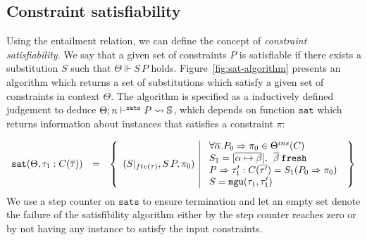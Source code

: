 \documentclass[a4paper, 11pt]{article}
\begin{document}
\subsection{Constraint satisfiability}

Using the entailment relation, we can define the concept of 
\emph{constraint satisfiability}. We say that a given set 
of constraints $P$ is satisfiable if there exists a substitution 
$S$ such that $\Theta \Vdash S\,P$ holds. Figure~\ref{fig:sat-algorithm} 
presents an algorithm which returns a set of substitutions 
which satisfy a given set of constraints in context $\Theta$. 
The algorithm is specified as a inductively defined judgement 
to deduce $\sats{P}{\mathbb{S}}{n}$, which 
depends on function $\mathtt{sat}$ which returns information 
about instances that satisfies a constraint $\pi$:

\[
  \begin{array}{lcl}
    \texttt{sat}(\Theta,\tau_1 : C(\overline{\tau})) & = & \left\{\begin{array}{l|l} 
                                (S|_{ftv(\tau)}, S\,P, \pi_0) & 
                                  \begin{array}{l}
                                    \forall\overline{\alpha} . P_0 \Rightarrow \pi_0 \in \Theta^{ins}(C) \\ 
                                    S_1 = [\overline{\alpha\mapsto\beta}],\:\:\overline{\beta}\:\mathtt{fresh}\\ 
                                    P \Rightarrow \tau'_1 : C(\overline{\tau'}) = S_1(P_0\Rightarrow \pi_0)\\ 
                                    S = \mgu(\tau_1, \tau'_1)\\
                                  \end{array}
                             \end{array}\right\}
  \end{array}
\]
We use a step counter on $\mathtt{sats}$ to ensure termination and let 
an empty set denote the failure of the satisfibility algorithm either 
by the step counter reaches zero or by not having any instance to 
satisfy the input constraints.
\end{document}
